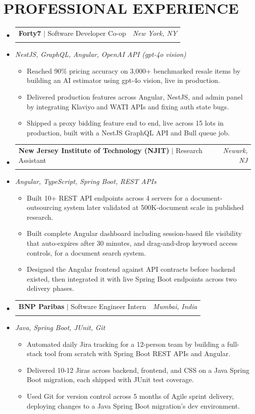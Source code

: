 \documentclass[letterpaper,11pt]{article}
\makeatletter
\newcommand{\resumeItem}[1]{
  \item\small{#1\vspace{-3pt}}
}
\newcommand{\resumeStack}[1]{
  \vspace{1pt}\item\small{\textit{#1}}\vspace{-6pt}
}
\newcommand{\resumeExpHeading}[4]{
  \vspace{-3pt}\item
    \begin{tabular*}{1.0\textwidth}[t]{l@{\extracolsep{\fill}}r}
      \textbf{\large #1} $|$ #2 & \textit{\large #3} \\
       & \text{\small #4} \\
    \end{tabular*}\vspace{-9pt}
}
\newcommand{\resumeItemListStart}{\begin{itemize}[leftmargin=0.15in, label=$\bullet$]}
\newcommand{\resumeItemListEnd}{\end{itemize}\vspace{-7pt}}
\newcommand{\resumeSubHeadingListStart}{\begin{itemize}[leftmargin=0.0in, label={}]}
\newcommand{\resumeSubHeadingListEnd}{\end{itemize}}
\makeatother
\begin{document}
\section{PROFESSIONAL EXPERIENCE}
\resumeSubHeadingListStart
\vspace{10pt}
\resumeExpHeading
{Forty7}{Software Developer Co-op}{New York, NY}{Jan 2026 -- May 2026}
\vspace{-13pt}
\resumeStack{NestJS, GraphQL, Angular, OpenAI API (gpt-4o vision)}
\resumeItemListStart
  \resumeItem{Reached 90\% pricing accuracy on 3,000+ benchmarked resale items by building an AI estimator using gpt-4o vision, live in production.}
  \resumeItem{Delivered production features across Angular, NestJS, and admin panel by integrating Klaviyo and WATI APIs and fixing auth state bugs.}
  \resumeItem{Shipped a proxy bidding feature end to end, live across 15 lots in production, built with a NestJS GraphQL API and Bull queue job.}
\resumeItemListEnd
\vspace{10pt}
\resumeExpHeading
{New Jersey Institute of Technology (NJIT)}{Research Assistant}{Newark, NJ}{Apr 2025 -- Sep 2025}
\vspace{-13pt}
\resumeStack{Angular, TypeScript, Spring Boot, REST APIs}
\resumeItemListStart
  \resumeItem{Built 10+ REST API endpoints across 4 servers for a document-outsourcing system later validated at 500K-document scale in published research.}
  \resumeItem{Built complete Angular dashboard including session-based file visibility that auto-expires after 30 minutes, and drag-and-drop keyword access controls, for a document search system.}
  \resumeItem{Designed the Angular frontend against API contracts before backend existed, then integrated it with live Spring Boot endpoints across two delivery phases.}
\resumeItemListEnd
\vspace{10pt}
\resumeExpHeading
{BNP Paribas}{Software Engineer Intern}{Mumbai, India}{Jan 2024 -- Jul 2024}
\vspace{-13pt}
\resumeStack{Java, Spring Boot, JUnit, Git}
\resumeItemListStart
  \resumeItem{Automated daily Jira tracking for a 12-person team by building a full-stack tool from scratch with Spring Boot REST APIs and Angular.}
  \resumeItem{Delivered 10-12 Jiras across backend, frontend, and CSS on a Java Spring Boot migration, each shipped with JUnit test coverage.}
  \resumeItem{Used Git for version control across 5 months of Agile sprint delivery, deploying changes to a Java Spring Boot migration's dev environment.}
\resumeItemListEnd

\resumeSubHeadingListEnd
\end{document}
